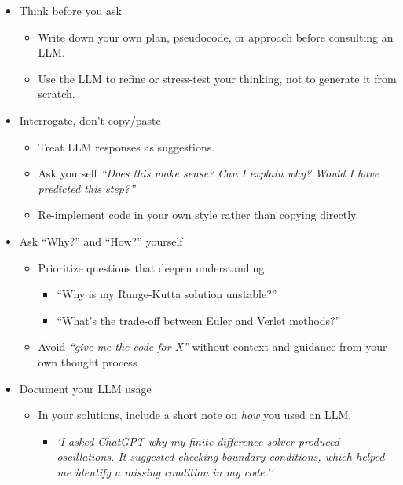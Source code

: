 \documentclass[12pt]{article}
\begin{document}
  \begin{itemize}
    
    \item Think before you ask
    \begin{itemize}
      \item Write down your own plan, pseudocode, or approach before consulting an LLM.
      \item Use the LLM to refine or stress-test your thinking, not to generate it from scratch.
    \end{itemize}
    
    \item Interrogate, don’t copy/paste
    \begin{itemize}
      \item Treat LLM responses as suggestions.
      \item Ask yourself \textit{``Does this make sense? Can I explain why? Would I have predicted this step?''}
      \item Re-implement code in your own style rather than copying directly.
    \end{itemize}
    
    \item Ask ``Why?'' and ``How?'' yourself
    \begin{itemize}
      \item Prioritize questions that deepen understanding
      \begin{itemize}
        \item ``Why is my Runge-Kutta solution unstable?''
        \item ``What’s the trade-off between Euler and Verlet methods?''
      \end{itemize}
      \item Avoid \textit{``give me the code for X''} without context and guidance from your own thought process
    \end{itemize}
    
    \item Document your LLM usage
    \begin{itemize}
      \item In your solutions, include a short note on \textit{how} you used an LLM.
      \begin{itemize}
        \item \textit{`I asked ChatGPT why my finite-difference solver produced oscillations. It suggested checking boundary conditions, which helped me identify a missing condition in my code.''}
      \end{itemize} 
    \end{itemize}
    

\end{itemize}
\end{document}
